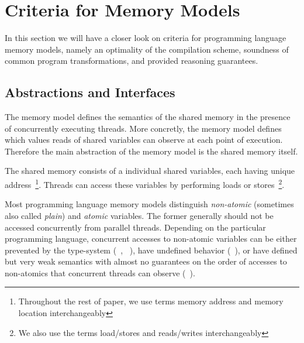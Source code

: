 \section{Criteria for Memory Models}
\label{sec:background}

In this section we will have a closer look on criteria for 
programming language memory models, 
namely an optimality of the compilation scheme, 
soundness of common program transformations, 
and provided reasoning guarantees.  

\subsection{Abstractions and Interfaces}

The memory model defines the semantics of the shared memory 
in the presence of concurrently executing threads. 
More concretly, the memory model 
defines which values reads of shared variables 
can observe at each point of execution. 
Therefore the main abstraction of the memory model 
is the shared memory itself. 

The shared memory consists of a individual shared variables, 
each having unique address~\footnote{
Throughout the rest of paper, we use terms 
memory address and memory location interchangeably}.
Threads can access these variables by performing 
loads or stores~\footnote{We also use the terms 
load/stores and reads/writes interchangeably}.


Most programming language memory models distinguish 
\emph{non-atomic} (sometimes also called \emph{plain})
and \emph{atomic} variables. 
The former generally should not be accessed 
concurrently from parallel threads. 
Depending on the particular programming language, 
concurrent accesses to non-atomic variables 
can be either prevented by the type-system 
(\eg \Haskell~\cite{Marlow-al:Haskell10, Vollmer-al:PPoPP17}, \Rust~\cite{RustBook:19}), 
have undefined behavior (\eg \CPP~\cite{Boehm-Adve:PLDI08, Batty-al:POPL11}), 
or have defined but very weak semantics with almost 
no guarantees on the order of accesses to non-atomics
that concurrent threads can observe (\eg \Java~\cite{Manson-al:POPL05}).

